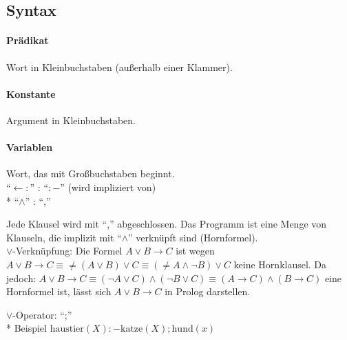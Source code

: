 \documentclass[a4paper]{scrartcl}
\begin{document}
\subsection{Syntax}
\paragraph{Prädikat} Wort in Kleinbuchstaben (außerhalb einer Klammer).
\paragraph{Konstante} Argument in Kleinbuchstaben.
\paragraph{Variablen} Wort, das mit Großbuchstaben beginnt.\\
"`$\leftarrow :$"' : "`$:-$"' (wird impliziert von)\\*
"`$\wedge$"' : "`,"'

Jede Klausel wird mit "`,"' abgeschlossen. Das Programm ist eine Menge von Klauseln, die implizit mit "`$\wedge$"' verknüpft sind (Hornformel).\\
$\vee$-Verknüpfung: Die Formel $A \vee B \rightarrow C$ ist wegen $A \vee B \rightarrow C \equiv \neq (A \vee B) \vee C \equiv (\neq A \wedge \neg B) \vee C$ keine Hornklausel. Da jedoch:
$A \vee B \rightarrow C \equiv (\neg A \vee C) \wedge (\neg B \vee C) \equiv (A \rightarrow C) \wedge (B \rightarrow C)$
eine Hornformel ist, lässt sich $A\vee B \rightarrow C$ in Prolog darstellen.

$\vee$-Operator: "`;"'\\*
Beispiel $\text{haustier}(X) :- \text{katze} (X); \text{hund}(x)$
\end{document}
